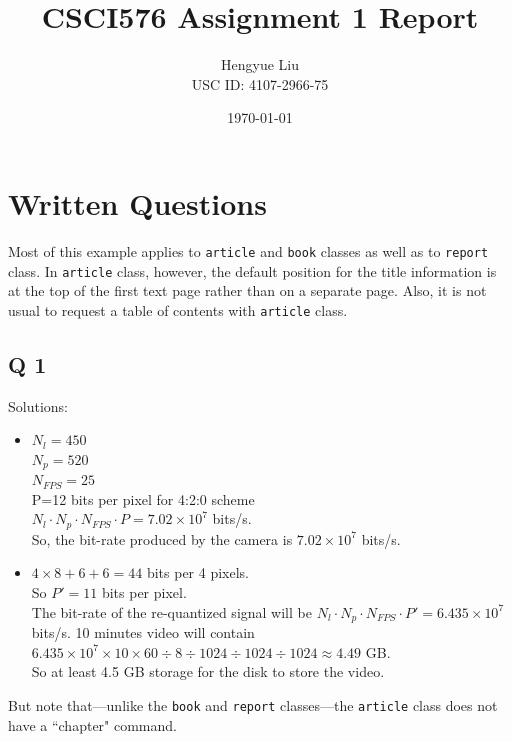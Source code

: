 \documentclass[10pt]{report}            %
\title{\bf CSCI576 Assignment 1 Report}  %
\author{Hengyue Liu\\USC ID: 4107-2966-75}              %
\date{\today}                           %
\begin{document}
\maketitle                              %
\setcounter{page}{2}                    %
\renewcommand{\chaptername}{Part}
\chapter{Written Questions}                %
Most of this example applies to \texttt{article} and \texttt{book} classes
as well as to \texttt{report} class. In \texttt{article} class, however,
the default position for the title information is at the top of
the first text page rather than on a separate page. Also, it is
not usual to request a table of contents with \texttt{article} class.
 
\section*{Q 1}                  %
Solutions:
\begin{itemize}
\item                           %
 $N_{l}=450$\\                                %
 $N_{p}=520$\\
 $N_{FPS}=25$\\ 
 P=12 bits per pixel for 4:2:0 scheme\\
 $N_l \cdot N_p \cdot N_{FPS} \cdot P = 7.02\times10^7$ bits/s.\\
 So, the bit-rate produced by the camera is $7.02\times10^7$ bits/s.\\
\item
$4 \times 8 + 6 + 6 = 44$ bits per 4 pixels.\\
So $P'=11$ bits per pixel.\\
The bit-rate of the re-quantized signal will be $N_l \cdot N_p \cdot N_{FPS} \cdot P'= 6.435\times10^7$ bits/s. 10 minutes video will contain $6.435 \times10^7 \times 10 \times 60 \div 8 \div 1024 \div 1024 \div 1024 \approx 4.49$ GB.\\
So at least 4.5 GB storage for the disk to store the video.\\
 \end{itemize}   
But note that---unlike the \texttt{book} and \texttt{report} classes---the
\texttt{article} class does not have a ``chapter" command.
\end{document}
